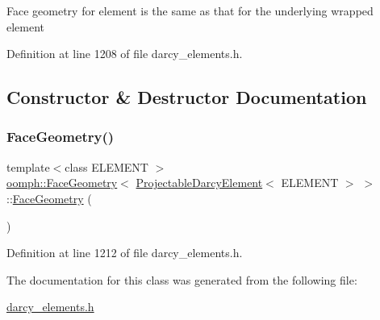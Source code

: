 Face geometry for element is the same as that for the underlying wrapped element 

Definition at line 1208 of file darcy\+\_\+elements.\+h.



\subsection{Constructor \& Destructor Documentation}
\mbox{\label{classoomph_1_1FaceGeometry_3_01ProjectableDarcyElement_3_01ELEMENT_01_4_01_4_a4bc15807a2a26faba2f115a1e98a845a}} 
\subsubsection{\texorpdfstring{Face\+Geometry()}{FaceGeometry()}}
{\footnotesize\ttfamily template$<$class E\+L\+E\+M\+E\+NT $>$ \\
\hyperlink{classoomph_1_1FaceGeometry}{oomph\+::\+Face\+Geometry}$<$ \hyperlink{classoomph_1_1ProjectableDarcyElement}{Projectable\+Darcy\+Element}$<$ E\+L\+E\+M\+E\+NT $>$ $>$\+::\hyperlink{classoomph_1_1FaceGeometry}{Face\+Geometry} (\begin{DoxyParamCaption}{ }\end{DoxyParamCaption})\hspace{0.3cm}{\ttfamily [inline]}}



Definition at line 1212 of file darcy\+\_\+elements.\+h.



The documentation for this class was generated from the following file\+:\begin{DoxyCompactItemize}
\item 
\hyperlink{darcy__elements_8h}{darcy\+\_\+elements.\+h}\end{DoxyCompactItemize}
